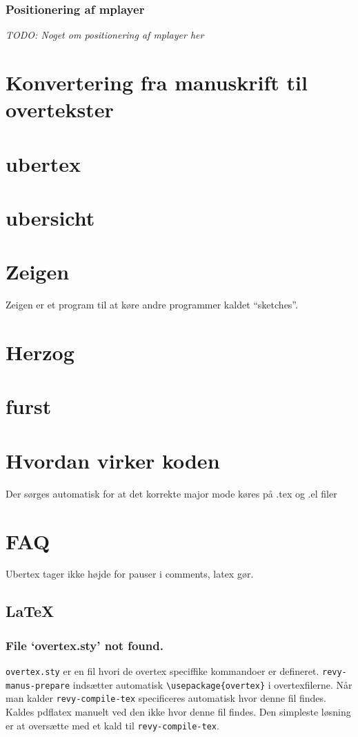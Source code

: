 \documentclass[10pt,a4paper,danish]{article}
\newcommand{\code}[1]{\colorbox{verbgray}{\texttt{#1}}}
\begin{document}
\subsubsection{Positionering af mplayer}
\textit{TODO: Noget om positionering af mplayer her}

\section{Konvertering fra manuskrift til overtekster}
\section{ubertex}
\section{ubersicht}
\section{Zeigen}
Zeigen er et program til at køre andre programmer kaldet ``sketches''.
\section{Herzog}

\section{furst}
\section{Hvordan virker koden}

Der sørges automatisk for at det korrekte major mode køres på .tex og .el filer

\section{FAQ}
Ubertex tager ikke højde for pauser i comments, latex gør.

\subsection{\LaTeX{}}
\subsubsection{File `overtex.sty' not found.}
\texttt{overtex.sty} er en fil hvori de overtex speciffike kommandoer er
defineret. \texttt{revy-manus-prepare} indsætter automatisk
\code{\textbackslash{}usepackage\{overtex\}} i overtexfilerne. Når man kalder
\texttt{revy-compile-tex} specificeres automatisk hvor denne fil findes. Kaldes
pdflatex manuelt ved den ikke hvor denne fil findes.
Den simpleste løsning er at oversætte med et kald til \texttt{revy-compile-tex}.
\end{document}
